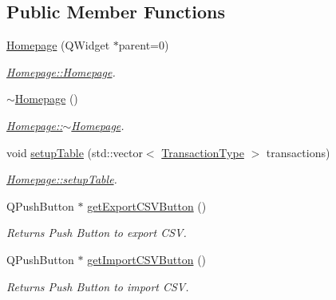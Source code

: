 \subsection*{Public Member Functions}
\begin{DoxyCompactItemize}
\item 
\mbox{\hyperlink{class_homepage_a7fd9acfe5e1e29c3f00118315fabac53}{Homepage}} (Q\+Widget $\ast$parent=0)
\begin{DoxyCompactList}\small\item\em \mbox{\hyperlink{class_homepage_a7fd9acfe5e1e29c3f00118315fabac53}{Homepage\+::\+Homepage}}. \end{DoxyCompactList}\item 
\mbox{\label{class_homepage_a72c86a050d06f14591a1ec1f2cf80c94}} 
\mbox{\hyperlink{class_homepage_a72c86a050d06f14591a1ec1f2cf80c94}{$\sim$\+Homepage}} ()
\begin{DoxyCompactList}\small\item\em \mbox{\hyperlink{class_homepage_a72c86a050d06f14591a1ec1f2cf80c94}{Homepage\+::$\sim$\+Homepage}}. \end{DoxyCompactList}\item 
void \mbox{\hyperlink{class_homepage_a8eeedb7e3e7b6144d7878e9525aad0ab}{setup\+Table}} (std\+::vector$<$ \mbox{\hyperlink{class_transaction_type}{Transaction\+Type}} $>$ transactions)
\begin{DoxyCompactList}\small\item\em \mbox{\hyperlink{class_homepage_a8eeedb7e3e7b6144d7878e9525aad0ab}{Homepage\+::setup\+Table}}. \end{DoxyCompactList}\item 
\mbox{\label{class_homepage_ab79175afe05f63d67e73a9cdd9942665}} 
Q\+Push\+Button $\ast$ \mbox{\hyperlink{class_homepage_ab79175afe05f63d67e73a9cdd9942665}{get\+Export\+C\+S\+V\+Button}} ()
\begin{DoxyCompactList}\small\item\em Returns Push Button to export C\+SV. \end{DoxyCompactList}\item 
\mbox{\label{class_homepage_a773f7450bd9c20ebe4e18020fe1cdcd5}} 
Q\+Push\+Button $\ast$ \mbox{\hyperlink{class_homepage_a773f7450bd9c20ebe4e18020fe1cdcd5}{get\+Import\+C\+S\+V\+Button}} ()
\begin{DoxyCompactList}\small\item\em Returns Push Button to import C\+SV. \end{DoxyCompactList}\item 

\end{DoxyCompactItemize}
